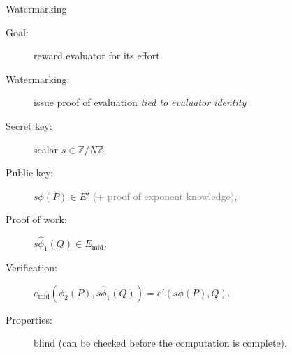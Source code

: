 \documentclass[aspectratio=169]{beamer}
\newcommand{\Z}{\mathbb{Z}}
\begin{document}
\begin{frame}{Watermarking}
  \def\Emid{E_{\mathrm{mid}}}
  \def\emid{e_{\mathrm{mid}}}
  \begin{description}
  \item[Goal:] reward evaluator for its effort.
  \item[Watermarking:] issue proof of evaluation \emph{tied to
      evaluator identity}
  \end{description}

  \centering

  \begin{description}
  \item[Secret key:] scalar $s\in\Z/N\Z$,
  \item[Public key:] $s\phi(P) \in E'$ \textcolor{gray}{(+ proof of exponent knowledge)},
  \item[Proof of work:] $s\hat\phi_1(Q) \in \Emid$,
  \item[Verification:] $\emid(\phi_2(P),s\hat\phi_1(Q)) = e'(s\phi(P),Q)$.
  \item[Properties:] blind (can be checked before the computation is
    complete).
  \end{description}
\end{frame}

\end{document}
